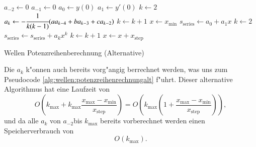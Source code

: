 \begin{algorithm}
	\begin{algorithmic}[1]
		\State $a_{-2} \gets 0$
		\State $a_{-1} \gets 0$
		\State $a_0 \gets y(0)$
		\State $a_1 \gets y'(0)$
		\State $k \gets 2$
			\State $a_k \gets -\cfrac{1}{k(k-1)} (aa_{k-4}+ba_{k-3}+ca_{k-2})$
			\State $k \gets k + 1$
		\EndFor
		\State $x \gets x_{\text{min}}$
			\State $s_{\text{series}} \gets a_0 + a_1x$
			\State $k \gets 2$
				\State $s_{\text{series}} \gets s_{\text{series}} + a_k x^k$
				\State $k \gets k + 1$
			\EndFor
			\State $x \gets x + x_{\text{step}}$
		\EndFor
	\end{algorithmic}
	\caption{Wellen Potenzreihenberechnung (Alternative)}
	\label{alg:wellen:potenzreihenrechnungalt}
\end{algorithm}

Die $a_k$ k"onnen auch bereits vorg"angig berrechnet werden, was uns zum 
Pseudocode \ref{alg:wellen:potenzreihenrechnungalt} f"uhrt. Dieser 
alternative Algorithmus hat eine Laufzeit von
\begin{equation*}
	O
	\left(k_{\text{max}} + 
		k_{\text{max}}\frac{x_{\text{max}}-x_{\text{min}}}{x_{\text{step}}}
	\right)
	=
	O
	\left(
		k_{\text{max}}
		\left(
			1+\frac{x_{\text{max}}-x_{\text{min}}}{x_{\text{step}}}
		\right)
	\right),
\end{equation*}
und da alle $a_k$ von $a_{-2}$bis $k_{\text{max}}$ bereits vorberechnet werden 
einen Speicherverbrauch von
\begin{equation*}
	O
	\left(
		k_{\text{max}}
	\right).
\end{equation*}